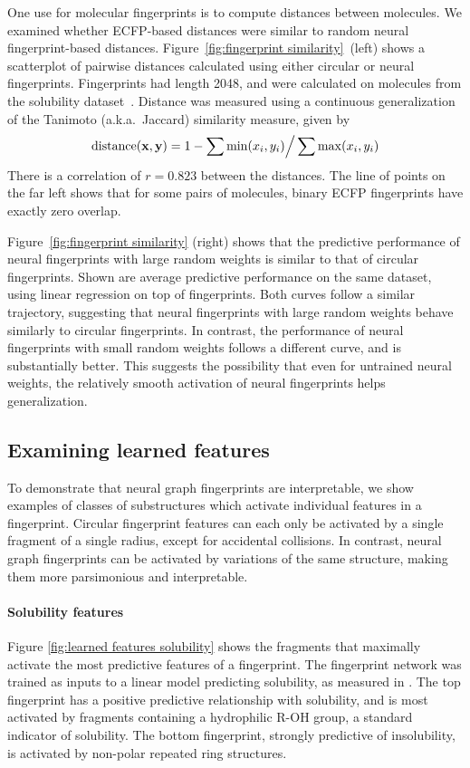 \documentclass{article}
\newcommand{\citep}{\cite}
\newcommand{\citet}{\cite}
\newcommand{\vx}{\mathbf{x}}
\newcommand{\vy}{\mathbf{y}}
\begin{document}
One use for molecular fingerprints is to compute distances between molecules.
We examined whether ECFP-based distances were similar to random neural fingerprint-based distances.
Figure~\ref{fig:fingerprint similarity}~(left) shows a scatterplot of pairwise distances calculated using either  circular or neural fingerprints.
Fingerprints had length 2048, and were calculated on molecules from the solubility dataset~\citet{delaney_data_2004}.
Distance was measured using a continuous generalization of the Tanimoto (a.k.a.\ Jaccard) similarity measure, given by
\begin{equation}
\textnormal{distance}(\vx, \vy) = 1 - \sum \min(x_i, y_i) \Big/ \sum \max(x_i, y_i)
\end{equation}
There is a correlation of $r = 0.823$ between the distances.
The line of points on the far left shows that for some pairs of molecules, binary ECFP fingerprints have exactly zero overlap.

Figure~\ref{fig:fingerprint similarity} (right) shows that the predictive performance of neural fingerprints with large random weights is similar to that of circular fingerprints.
Shown are average predictive performance on the same dataset, using linear regression on top of fingerprints.
Both curves follow a similar trajectory, suggesting that neural fingerprints with large random weights behave similarly to circular fingerprints.
In contrast, the performance of neural fingerprints with small random weights follows a different curve, and is substantially better.
This suggests the possibility that even for untrained neural weights, the relatively smooth activation of neural fingerprints helps generalization.

\subsection{Examining learned features}
To demonstrate that neural graph fingerprints are interpretable, we show examples of classes of substructures which activate individual features in a fingerprint.
Circular fingerprint features can each only be activated by a single fragment of a single radius, except for accidental collisions.
In contrast, neural graph fingerprints can be activated by variations of the same structure, making them more parsimonious and interpretable.

\paragraph{Solubility features}
Figure \ref{fig:learned features solubility} shows the fragments that maximally activate the most predictive features of a fingerprint.
The fingerprint network was trained as inputs to a linear model predicting solubility, as measured in \citep{delaney_data_2004}.
The top fingerprint has a positive predictive relationship with solubility, and is most activated by fragments containing a hydrophilic R-OH group, a standard indicator of solubility.
The bottom fingerprint, strongly predictive of insolubility, is activated by non-polar repeated ring structures.
\end{document}
